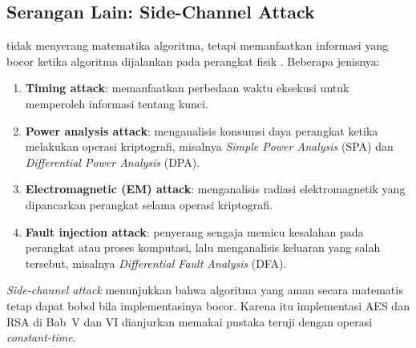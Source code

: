 \subsection{Serangan Lain: Side-Channel Attack}

 tidak menyerang matematika algoritma, tetapi memanfaatkan informasi yang bocor ketika algoritma dijalankan pada perangkat fisik \cite{munir_slides_itb,kochert1996}. Beberapa jenisnya:
\begin{enumerate}
  \item \textbf{Timing attack}: memanfaatkan perbedaan waktu eksekusi untuk memperoleh informasi tentang kunci.
  \item \textbf{Power analysis attack}: menganalisis konsumsi daya perangkat ketika melakukan operasi kriptografi, misalnya \textit{Simple Power Analysis} (SPA) dan \textit{Differential Power Analysis} (DPA).
  \item \textbf{Electromagnetic (EM) attack}: menganalisis radiasi elektromagnetik yang dipancarkan perangkat selama operasi kriptografi.
  \item \textbf{Fault injection attack}: penyerang sengaja memicu kesalahan pada perangkat atau proses komputasi, lalu menganalisis keluaran yang salah tersebut, misalnya \textit{Differential Fault Analysis} (DFA).
\end{enumerate}

\begin{catatan}
\textit{Side-channel attack} menunjukkan bahwa algoritma yang aman secara matematis tetap dapat bobol bila implementasinya bocor. Karena itu implementasi AES dan RSA di Bab~V dan VI dianjurkan memakai pustaka teruji dengan operasi \textit{constant-time}.
\end{catatan}

